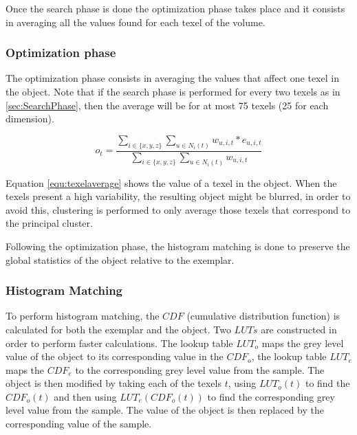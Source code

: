 Once the search phase is done the optimization phase takes place and it consists in averaging 
all the values found for each texel of the volume. 

\subsubsection{Optimization phase}
\label{sec:OptimizationPhase}

The optimization phase consists in averaging the values that affect one texel in the object. Note that
if the search phase is performed for every two texels as in \ref{sec:SearchPhase}, 
then the average will be for at most 75 texels (25 for each dimension).

\begin{equation}
 o_t = \frac{ \sum_{i \in \{x, y, z\}} \sum_{u \in N_i(t)} w_{u, i, t} * e_{u, i, t} }{ \sum_{i \in \{x, y, z\}} \sum_{u \in N_i(t)} w_{u, i, t} }
 \label{equ:texelaverage}
\end{equation}

Equation \ref{equ:texelaverage} shows the value of a texel in the object. 
When the texels present a high variability, the resulting object might be
blurred, in order to avoid this, 
clustering is performed to only average those texels that correspond to the principal cluster.

Following the optimization phase, the histogram matching is done to preserve the 
global statistics of the object relative to the exemplar.  

\subsubsection{Histogram Matching}
\label{sec:histogramMatching}

To perform histogram matching, the $CDF$ (cumulative distribution function) is calculated for both the exemplar and the object. 
Two $LUTs$ are constructed in order to perform faster calculations. The lookup table $LUT_o$ maps the grey level value of the object
to its corresponding value in the $CDF_o$, the lookup table $LUT_e$ maps the $CDF_e$
to the corresponding grey level value from the sample. 
The object is then modified by taking each of the texels $t$, using $LUT_o(t)$ to find the $CDF_o(t)$
and then using $LUT_e(CDF_o(t))$ to find the corresponding grey level value from the sample. The value of the object is then replaced 
by the corresponding value of the sample.

